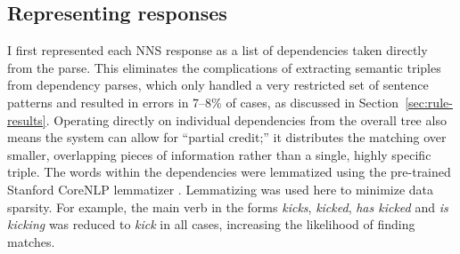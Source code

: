 \subsection{Representing responses}
\label{sec:response-rep}

I first represented each NNS response as a list of dependencies taken directly from the parse. 
This eliminates the complications of extracting semantic triples from
dependency parses, which only handled a very restricted set of
sentence patterns and resulted in errors in 7--8\% of cases, as discussed in Section~\ref{sec:rule-results}.
Operating directly on individual dependencies from the overall tree also means the system can allow for ``partial credit;'' it distributes the matching over smaller,
overlapping pieces of information rather than a single, highly specific triple. The words within the dependencies were lemmatized using the pre-trained Stanford CoreNLP lemmatizer \citep{stanford-corenlp-2014}. Lemmatizing was used here to minimize data sparsity. For example, the main verb in the forms \textit{kicks}, \textit{kicked}, \textit{has kicked} and \textit{is kicking} was reduced to \textit{kick} in all cases, increasing the likelihood of finding matches.

